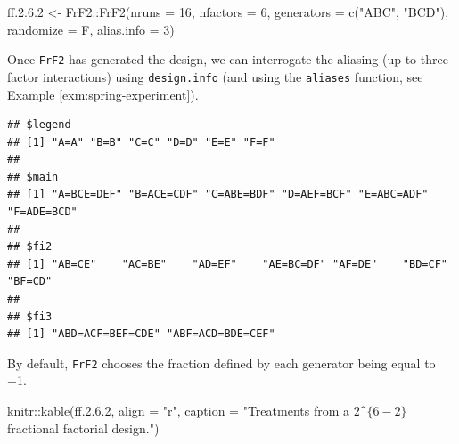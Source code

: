 \documentclass[
]{book}
\newenvironment{Shaded}{\begin{snugshade}}{\end{snugshade}}
\newcommand{\AttributeTok}[1]{\textcolor[rgb]{0.77,0.63,0.00}{#1}}
\newcommand{\DecValTok}[1]{\textcolor[rgb]{0.00,0.00,0.81}{#1}}
\newcommand{\FloatTok}[1]{\textcolor[rgb]{0.00,0.00,0.81}{#1}}
\newcommand{\FunctionTok}[1]{\textcolor[rgb]{0.00,0.00,0.00}{#1}}
\newcommand{\NormalTok}[1]{#1}
\newcommand{\OtherTok}[1]{\textcolor[rgb]{0.56,0.35,0.01}{#1}}
\newcommand{\SpecialCharTok}[1]{\textcolor[rgb]{0.00,0.00,0.00}{#1}}
\newcommand{\StringTok}[1]{\textcolor[rgb]{0.31,0.60,0.02}{#1}}
\theoremstyle{definition}
\theoremstyle{definition}
\theoremstyle{definition}
\theoremstyle{definition}
\theoremstyle{remark}
\begin{document}
\begin{Shaded}
\begin{Highlighting}[]
\NormalTok{ff.}\DecValTok{2}\NormalTok{.}\FloatTok{6.2} \OtherTok{\textless{}{-}}\NormalTok{ FrF2}\SpecialCharTok{::}\FunctionTok{FrF2}\NormalTok{(}\AttributeTok{nruns =} \DecValTok{16}\NormalTok{, }\AttributeTok{nfactors =} \DecValTok{6}\NormalTok{, }\AttributeTok{generators =} \FunctionTok{c}\NormalTok{(}\StringTok{"ABC"}\NormalTok{, }\StringTok{"BCD"}\NormalTok{), }
                       \AttributeTok{randomize =}\NormalTok{ F, }\AttributeTok{alias.info =} \DecValTok{3}\NormalTok{)}
\end{Highlighting}
\end{Shaded}

Once \texttt{FrF2} has generated the design, we can interrogate the aliasing (up to three-factor interactions) using \texttt{design.info} (and using the \texttt{aliases} function, see Example \ref{exm:spring-experiment}).

\begin{Shaded}
\end{Shaded}

\begin{verbatim}
## $legend
## [1] "A=A" "B=B" "C=C" "D=D" "E=E" "F=F"
## 
## $main
## [1] "A=BCE=DEF" "B=ACE=CDF" "C=ABE=BDF" "D=AEF=BCF" "E=ABC=ADF" "F=ADE=BCD"
## 
## $fi2
## [1] "AB=CE"    "AC=BE"    "AD=EF"    "AE=BC=DF" "AF=DE"    "BD=CF"    "BF=CD"   
## 
## $fi3
## [1] "ABD=ACF=BEF=CDE" "ABF=ACD=BDE=CEF"
\end{verbatim}

By default, \texttt{FrF2} chooses the fraction defined by each generator being equal to +1.

\begin{Shaded}
\begin{Highlighting}[]
\NormalTok{knitr}\SpecialCharTok{::}\FunctionTok{kable}\NormalTok{(ff.}\DecValTok{2}\NormalTok{.}\FloatTok{6.2}\NormalTok{, }\AttributeTok{align =} \StringTok{"r"}\NormalTok{, }
             \AttributeTok{caption =} \StringTok{"Treatments from a $2\^{}\{6{-}2\}$ fractional factorial design."}\NormalTok{)}
\end{Highlighting}
\end{Shaded}
\end{document}
